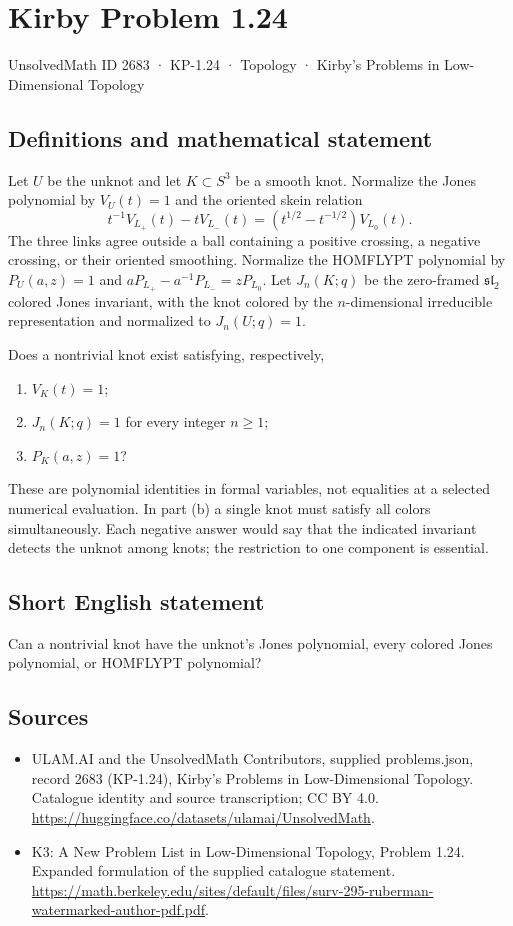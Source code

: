 \documentclass[11pt,a4paper]{article}
\begin{document}
\section*{Kirby Problem 1.24}\label{2683}
{\small UnsolvedMath ID 2683 · KP-1.24 · Topology · Kirby's Problems in Low-Dimensional Topology}
\subsection{Definitions and mathematical statement}
Let $U$ be the unknot and let $K\subset S^3$ be a smooth knot. Normalize the Jones
polynomial by $V_U(t)=1$ and the oriented skein relation
\[
t^{-1}V_{L_+}(t)-tV_{L_-}(t)
=(t^{1/2}-t^{-1/2})V_{L_0}(t).
\]
The three links agree outside a ball containing a positive crossing, a negative
crossing, or their oriented smoothing. Normalize the HOMFLYPT polynomial by
$P_U(a,z)=1$ and $aP_{L_+}-a^{-1}P_{L_-}=zP_{L_0}$.
Let $J_n(K;q)$ be the zero-framed $\mathfrak{sl}_2$ colored Jones invariant,
with the knot colored by the $n$-dimensional irreducible representation and
normalized to $J_n(U;q)=1$.

Does a nontrivial knot exist satisfying, respectively,
\begin{enumerate}
\item $V_K(t)=1$;
\item $J_n(K;q)=1$ for every integer $n\geq1$;
\item $P_K(a,z)=1$?
\end{enumerate}
These are polynomial identities in formal variables, not equalities at a selected
numerical evaluation. In part (b) a single knot must satisfy all colors
simultaneously. Each negative answer would say that the indicated invariant
detects the unknot among knots; the restriction to one component is essential.
\subsection{Short English statement}
Can a nontrivial knot have the unknot's Jones polynomial, every colored Jones polynomial, or HOMFLYPT polynomial?
\subsection{Sources}
\begin{itemize}
\item[S1] ULAM.AI and the UnsolvedMath Contributors, supplied problems.json, record 2683 (KP-1.24), Kirby's Problems in Low-Dimensional Topology. Catalogue identity and source transcription; CC BY 4.0.
\url{https://huggingface.co/datasets/ulamai/UnsolvedMath}.
\item[S2] K3: A New Problem List in Low-Dimensional Topology, Problem 1.24. Expanded formulation of the supplied catalogue statement.
\url{https://math.berkeley.edu/sites/default/files/surv-295-ruberman-watermarked-author-pdf.pdf}.
\end{itemize}
\end{document}
